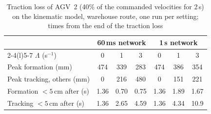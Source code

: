 \begin{table}[!t]
\caption{Traction loss of AGV~2 (40\% of the commanded velocities for 2\,s) on the kinematic model, warehouse route, one run per setting; times from the end of the traction loss}\label{tab:slip}
\centering\footnotesize
\setlength{\tabcolsep}{2.4pt}
\begin{tabular}{@{}lcccccc@{}}\toprule
 & \multicolumn{3}{c}{60\,ms network} & \multicolumn{3}{c}{1\,s network}\\\cmidrule(lr){2-4}\cmidrule(l){5-7}
$\Lambda$ (s$^{-1}$) & 0 & 1 & 3 & 0 & 1 & 3\\\midrule
Peak formation (mm) & 474 & 339 & 283 & 474 & 386 & 354\\
Peak tracking, others (mm) & 0 & 216 & 480 & 0 & 151 & 221\\
Formation $<5$\,cm after (s) & 1.36 & 0.70 & 0.75 & 1.36 & 1.89 & 1.67\\
Tracking $<5$\,cm after (s) & 1.36 & 2.65 & 4.59 & 1.36 & 4.34 & 10.9\\\bottomrule
\end{tabular}
\end{table}
